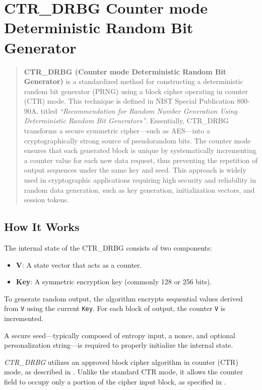 \section{CTR\_DRBG Counter mode Deterministic Random Bit Generator}
\label{sec:counter_mode_deterministic_random_bit_generator}

\begin{quote}
\textbf{CTR\_DRBG (Counter mode Deterministic Random Bit Generator)} is a standardized method for constructing a deterministic random bit generator (PRNG) using a block cipher operating in counter (CTR) mode. This technique is defined in NIST Special Publication 800-90A, titled \textit{``Recommendation for Random Number Generation Using Deterministic Random Bit Generators''}. Essentially, CTR\_DRBG transforms a secure symmetric cipher---such as AES---into a cryptographically strong source of pseudorandom bits. The counter mode ensures that each generated block is unique by systematically incrementing a counter value for each new data request, thus preventing the repetition of output sequences under the same key and seed. This approach is widely used in cryptographic applications requiring high security and reliability in random data generation, such as key generation, initialization vectors, and session tokens.
\end{quote}

\subsection*{How It Works}

The internal state of the CTR\_DRBG consists of two components:

\begin{itemize}
    \item \textnormal{\textbf{V}}: A state vector that acts as a counter.
    \item \textnormal{\textbf{Key}}: A symmetric encryption key (commonly 128 or 256 bits).
\end{itemize}

To generate random output, the algorithm encrypts sequential values derived from \texttt{V} using the current \texttt{Key}. For each block of output, the counter \texttt{V} is incremented. 

A secure seed—typically composed of entropy input, a nonce, and optional personalization string—is required to properly initialize the internal state.

\textit{CTR\_DRBG} utilizes an approved block cipher algorithm in counter (CTR) mode, as described in \cite{nist80090a}. Unlike the standard CTR mode, it allows the counter field to occupy only a portion of the cipher input block, as specified in \cite{nist80038d}.

